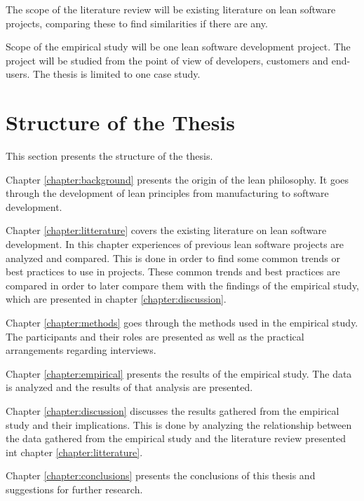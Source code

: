 The scope of the literature review will be existing literature on lean software projects, comparing these to find similarities if there are any.

Scope of the empirical study will be one lean software development project. The project will be studied from the point of view of developers, customers and end-users. The thesis is limited to one case study.

\section{Structure of the Thesis}
\label{section:structure}

This section presents the structure of the thesis.\\


Chapter \ref{chapter:background} presents the origin of the lean philosophy. It goes through the development of lean principles from manufacturing to software development.

Chapter \ref{chapter:litterature} covers the existing literature on lean software development. In this chapter experiences of previous lean software projects are analyzed and compared. This is done in order to find some common trends or best practices to use in projects. These common trends and best practices are compared in order to later compare them with the findings of the empirical study, which are presented in chapter \ref{chapter:discussion}.

Chapter \ref{chapter:methods} goes through the methods used in the empirical study. The participants and their roles are presented as well as the practical arrangements regarding interviews.

Chapter \ref{chapter:empirical} presents the results of the empirical study. The data is analyzed and the results of that analysis are presented.

Chapter \ref{chapter:discussion} discusses the results gathered from the empirical study and their implications. This is done by analyzing the relationship between the data gathered from the empirical study and the literature review presented int chapter \ref{chapter:litterature}.

Chapter \ref{chapter:conclusions} presents the conclusions of this thesis and suggestions for further research.
